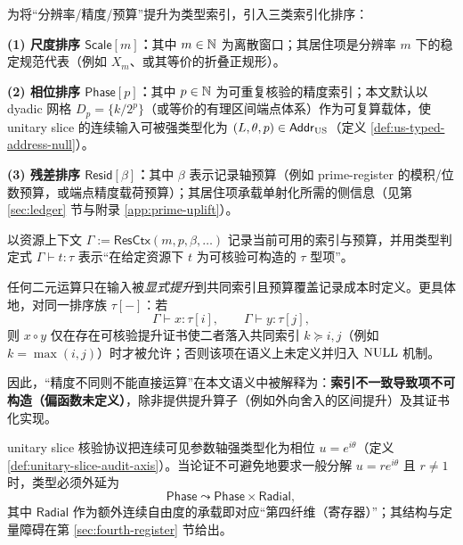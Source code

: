 \begin{definition}[索引化排序与资源上下文]\label{def:indexed-sorts-resctx}
为将“分辨率/精度/预算”提升为类型索引，引入三类索引化排序：\par
\noindent\textbf{(1) 尺度排序 $\mathsf{Scale}[m]$：}其中 $m\in\mathbb{N}$ 为离散窗口；其居住项是分辨率 $m$ 下的稳定规范代表（例如 $X_m$、或其等价的折叠正规形）。\par
\noindent\textbf{(2) 相位排序 $\mathsf{Phase}[p]$：}其中 $p\in\mathbb{N}$ 为可重复核验的精度索引；本文默认以 dyadic 网格 $D_p=\{k/2^p\}$（或等价的有理区间端点体系）作为可复算载体，使 unitary slice 的连续输入可被强类型化为 $(L,\theta,p)\in\mathsf{Addr}_{\mathrm{US}}$（定义 \ref{def:us-typed-address-null}）。\par
\noindent\textbf{(3) 残差排序 $\mathsf{Resid}[\beta]$：}其中 $\beta$ 表示记录轴预算（例如 prime-register 的模积/位数预算，或端点精度载荷预算）；其居住项承载单射化所需的侧信息（见第 \ref{sec:ledger} 节与附录 \ref{app:prime-uplift}）。\par
以资源上下文 $\Gamma:=\mathsf{ResCtx}(m,p,\beta,\dots)$ 记录当前可用的索引与预算，并用类型判定式 $\Gamma\vdash t:\tau$ 表示“在给定资源下 $t$ 为可核验可构造的 $\tau$ 型项”。
\end{definition}

\begin{definition}\label{def:common-refinement-type-failure}
任何二元运算只在输入被\emph{显式提升}到共同索引且预算覆盖记录成本时定义。更具体地，对同一排序族 $\tau[-]$：若
$$
\Gamma\vdash x:\tau[i],\qquad \Gamma\vdash y:\tau[j],
$$
则 $x\circ y$ 仅在存在可核验提升证书使二者落入共同索引 $k\succeq i,j$（例如 $k=\max(i,j)$）时才被允许；否则该项在语义上未定义并归入 $\mathrm{NULL}$ 机制。\par
因此，“精度不同则不能直接运算”在本文语义中被解释为：\textbf{索引不一致导致项不可构造（偏函数未定义）}，除非提供提升算子（例如外向舍入的区间提升）及其证书化实现。
\end{definition}

\begin{remark}\label{rem:unitary-slice-type-closure}
unitary slice 核验协议把连续可见参数轴强类型化为相位 $u=e^{i\theta}$（定义 \ref{def:unitary-slice-audit-axis}）。当论证不可避免地要求一般分解 $u=re^{i\theta}$ 且 $r\neq 1$ 时，类型必须外延为
$$
\mathsf{Phase}\leadsto \mathsf{Phase}\times \mathsf{Radial},
$$
其中 $\mathsf{Radial}$ 作为额外连续自由度的承载即对应“第四纤维（寄存器）”；其结构与定量障碍在第 \ref{sec:fourth-register} 节给出。
\end{remark}

